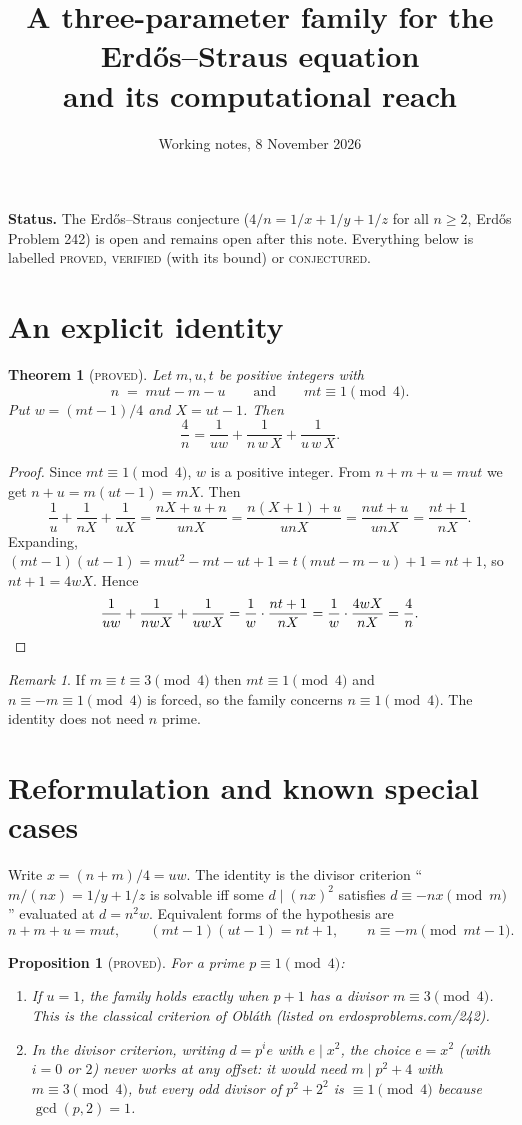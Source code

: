 \documentclass[11pt]{article}
\title{A three-parameter family for the Erd\H{o}s--Straus equation\\ and its computational reach}
\author{Working notes, 8 November 2026}
\date{}
\newtheorem{theorem}{Theorem}
\newtheorem{proposition}{Proposition}
\theoremstyle{remark}
\newtheorem*{remark}{Remark}
\begin{document}
\maketitle

\noindent\textbf{Status.} The Erd\H{o}s--Straus conjecture ($4/n=1/x+1/y+1/z$ for all $n\ge 2$, Erd\H{o}s Problem 242) is open and remains open after this note. Everything below is labelled \textsc{proved}, \textsc{verified} (with its bound) or \textsc{conjectured}.

\section{An explicit identity}

\begin{theorem}[\textsc{proved}]\label{thm:A}
Let $m,u,t$ be positive integers with
\[
  n \;=\; mut-m-u \qquad\text{and}\qquad mt\equiv 1 \pmod 4 .
\]
Put $w=(mt-1)/4$ and $X=ut-1$. Then
\[
  \frac4n=\frac1{uw}+\frac1{n\,w\,X}+\frac1{u\,w\,X}.
\]
\end{theorem}

\begin{proof}
Since $mt\equiv1\pmod 4$, $w$ is a positive integer. From $n+m+u=mut$ we get $n+u=m(ut-1)=mX$. Then
\[
  \frac1u+\frac1{nX}+\frac1{uX}=\frac{nX+u+n}{unX}=\frac{n(X+1)+u}{unX}=\frac{nut+u}{unX}=\frac{nt+1}{nX}.
\]
Expanding, $(mt-1)(ut-1)=mut^2-mt-ut+1=t(mut-m-u)+1=nt+1$, so $nt+1=4wX$. Hence
\[
  \frac1{uw}+\frac1{nwX}+\frac1{uwX}=\frac1w\cdot\frac{nt+1}{nX}=\frac1w\cdot\frac{4wX}{nX}=\frac4n .\qedhere
\]
\end{proof}

\begin{remark}
If $m\equiv t\equiv 3\pmod 4$ then $mt\equiv1\pmod 4$ and $n\equiv -m\equiv 1\pmod 4$ is forced, so the family concerns $n\equiv1\pmod 4$. The identity does not need $n$ prime.
\end{remark}

\section{Reformulation and known special cases}

Write $x=(n+m)/4=uw$. The identity is the divisor criterion ``$m/(nx)=1/y+1/z$ is solvable iff some $d\mid (nx)^2$ satisfies $d\equiv -nx \pmod m$'' evaluated at $d=n^2w$. Equivalent forms of the hypothesis are
\[
  n+m+u=mut,\qquad (mt-1)(ut-1)=nt+1,\qquad n\equiv -m \pmod{mt-1}.
\]
\begin{proposition}[\textsc{proved}]
For a prime $p\equiv 1\pmod 4$:
\begin{enumerate}
\item If $u=1$, the family holds exactly when $p+1$ has a divisor $m\equiv 3\pmod 4$. This is the classical criterion of Obl\'ath (listed on erdosproblems.com/242).
\item In the divisor criterion, writing $d=p^{i}e$ with $e\mid x^2$, the choice $e=x^2$ (with $i=0$ or $2$) never works at any offset: it would need $m\mid p^2+4$ with $m\equiv3\pmod 4$, but every odd divisor of $p^2+2^2$ is $\equiv1\pmod 4$ because $\gcd(p,2)=1$.
\end{enumerate}
\end{proposition}
\end{document}
